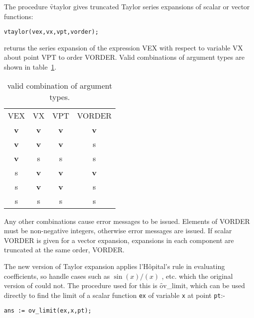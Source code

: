 The procedure \f{vtaylor} gives truncated Taylor series expansions of scalar
or vector functions: 
\hypertarget{operator:VTAYLOR}{}
\begin{verbatim}
vtaylor(vex,vx,vpt,vorder);
\end{verbatim}
returns the series expansion of the expression 
VEX  with respect to variable VX 
about point VPT  to order VORDER.  Valid
combinations of argument types are shown in table~\ref{ORTHOVEC:validexp}.

\begin{table}
\begin{center}
\begin{tabular}{cccc}
VEX & VX & VPT &  VORDER \\[2ex]
\textbf{v} & \textbf{v} &  \textbf{v} &  \textbf{v}\\
\textbf{v} &  \textbf{v} & \textbf{v} & s\\
\textbf{v} & s & s & s \\
s & \textbf{v} &  \textbf{v} & \textbf{v}   \\
s & \textbf{v} & \textbf{v} & s\\
s & s & s & s\\
\end{tabular}
\end{center}
\caption{ valid combination of argument types.}\label{ORTHOVEC:validexp}
\end{table}

Any other combinations cause error messages to be issued.  Elements of
VORDER must be non-negative integers, otherwise error messages are
issued.  If scalar VORDER is given for a vector expansion, expansions
in each component are truncated at the same order, VORDER.

\hypertarget{operator:OV_LIMIT}{}
The new version of Taylor expansion applies 
l'H\^opital's rule in evaluating coefficients, so handle cases such as
$\sin(x) / (x) $ , etc.  which the original version of  could
not. The procedure used for this is \f{ov\_limit},  which can
be used directly to find the limit of a scalar function \texttt{ex} of
variable \texttt{x} at point \texttt{pt}:-

\begin{verbatim}
ans := ov_limit(ex,x,pt);
\end{verbatim}

